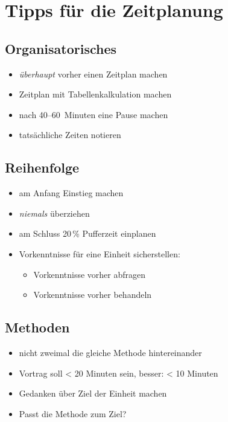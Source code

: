 \chapter{Tipps für die Zeitplanung}

\section{Organisatorisches}
\begin{itemize}
  \item \emph{überhaupt} vorher einen Zeitplan machen
  \item Zeitplan mit Tabellenkalkulation machen
  \item nach 40--60~Minuten eine Pause machen
  \item tatsächliche Zeiten notieren
\end{itemize}

\section{Reihenfolge}
\begin{itemize}
  \item am Anfang Einstieg machen
  \item \emph{niemals} überziehen
  \item am Schluss 20\,\% Pufferzeit einplanen
  \item Vorkenntnisse für eine Einheit sicherstellen:
    \begin{itemize}
      \item Vorkenntnisse vorher abfragen
      \item Vorkenntnisse vorher behandeln
    \end{itemize}
\end{itemize}

\section{Methoden}
\begin{itemize}
  \item nicht zweimal die gleiche Methode hintereinander
  \item Vortrag soll < 20 Minuten sein, besser: < 10 Minuten
  \item Gedanken über Ziel der Einheit machen
  \item Passt die Methode zum Ziel?
\end{itemize}
